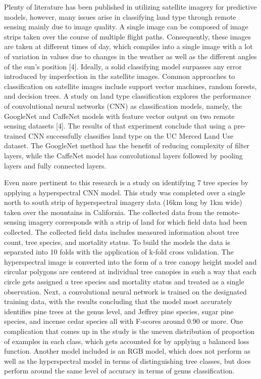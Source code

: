\documentclass[12pt,twoside]{reedthesis}
\begin{document}
Plenty of literature has been published in utilizing satellite imagery for predictive models, however, many issues arise in classifying land type through remote sensing mainly due to image quality. A single image can be composed of image strips taken over the course of multiple flight paths. Consequently, these images are taken at different times of day, which compiles into a single image with a lot of variation in values due to changes in the weather as well as the different angles of the sun's position {[}4{]}. Ideally, a solid classifying model surpasses any error introduced by imperfection in the satellite images. Common approaches to classification on satellite images include support vector machines, random forests, and decision trees. A study on land type classification explores the performance of convolutional neural networks (CNN) as classification models, namely, the GoogleNet and CaffeNet models with feature vector output on two remote sensing datasets {[}4{]}. The results of that experiment conclude that using a pre-trained CNN successfully classifies land type on the UC Merced Land Use dataset. The GoogleNet method has the benefit of reducing complexity of filter layers, while the CaffeNet model has convolutional layers followed by pooling layers and fully connected layers.

Even more pertinent to this research is a study on identifying 7 tree species by applying a hyperspectral CNN model. This study was completed over a single north to south strip of hyperspectral imagery data (16km long by 1km wide) taken over the mountains in California. The collected data from the remote-sensing imagery corresponds with a strip of land for which field data had been collected. The collected field data includes measured information about tree count, tree species, and mortality status. To build the models the data is separated into 10 folds with the application of k-fold cross validation. The hyperspectral image is converted into the form of a tree canopy height model and circular polygons are centered at individual tree canopies in such a way that each circle gets assigned a tree species and mortality status and treated as a single observation. Next, a convolutional neural network is trained on the designated training data, with the results concluding that the model most accurately identifies pine trees at the genus level, and Jeffrey pine species, sugar pine species, and incense cedar species all with F-scores around 0.90 or more. One complication that comes up in the study is the uneven distribution of proportion of examples in each class, which gets accounted for by applying a balanced loss function. Another model included is an RGB model, which does not perform as well as the hyperspectral model in terms of distinguishing tree classes, but does perform around the same level of accuracy in terms of genus classification.
\end{document}
